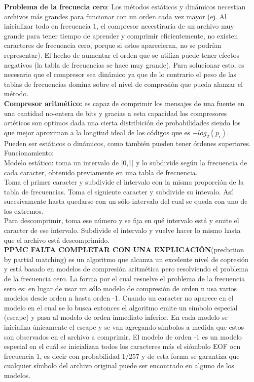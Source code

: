 \documentclass[titlepage,a4paper]{article}
\begin{document}
\textbf{Problema de la frecuecia cero}: Los métodos estáticos y dinámicos necestian archivos más grandes para funcionar con un orden cada vez mayor (ej. Al inicializar todo en frecuencia 1, el compresor necestiraría de un archivo muy grande para tener tiempo de aprender y comprimir eficientemente, no existen caracteres de frecuencia cero, porque si estos aparecieran, no se podrían representar). El hecho de aumentar el orden que se utiliza puede tener efectos negativos (la tabla de frecuencias se hace muy grande). Para solucionar esto, es necesario que el compresor sea dinámico ya que de lo contrario el peso de las tablas de frecuencias domina sobre el nivel de compresión que pueda alanzar el método. \\

\textbf{Compresor aritmético:} es capaz de comprimir los mensajes de una fuente en una cantidad no-entera de bits y gracias a esta capacidad los compresores artéticos son optimos dada una cierta distribición de probabilidades siendo los que mejor aproximan a la longitud ideal de los códigos que es $-log_2(p_i)$. Pueden ser estáticos o dinámicos, como también pueden tener órdenes superiores. \\

Funcionamiento: \\
Modelo estático: toma un intervalo de [0,1] y lo subdivide según la frecuencia de cada caracter, obtenido previamente en una tabla de frecuencia.\\
Toma el primer caracter y subdivide el intervalo con la misma proporción de la tabla de frecuencias. Toma el siguiente caracter y subdivide su intevalo. Así sucesivamente hasta quedarse con un sólo intervalo del cual se queda con uno de los extremos. \\
Para descomprimir, toma ese número y se fija en qué intervalo está y emite el caracter de ese intervalo. Subdivide el intervalo y vuelve hacer lo mismo hasta que el archivo está descomprimido. \\

\textbf{PPMC FALTA COMPLETAR CON UNA EXPLICACIÓN}(prediction by partial matching) es un algoritmo que alcanza un excelente nivel de copresión y está basado en modelos de compresión aritmética pero resolviendo el problema de la frecuencia cero. La forma por el cual resuelve el problema de la frecuencia sero es: en lugar de usar un sólo modelo de compresión de orden n usa varios modelos desde orden n hasta orden -1. Cuando un caracter no aparece en el modelo en el cual se lo busca entonces el algoritmo emite un símbolo especial (escape) y pasa al modelo de orden inmediato inferior. En cada modelo se inicializa únicamente el escape y se van agregando símbolos a medida que estos son observados en el archivo a comprimir. El modelo de orden -1 es un modelo especial en el cuál se inicializan todos los caracteres más el siómbolo EOF ocn frecuencia 1, es decir con probabilidad 1/257 y de esta forma se garantiza que cualquier símbolo del archivo original puede ser encontrado en alguno de los modelos. 
\end{document}
